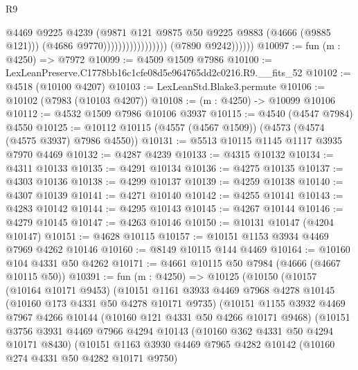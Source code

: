 \begin{lexlean}{R9}
\begin{coremodule}
                                              @4469
                                              @9225
                                              @4239
                                              (@9871
                                                @121
                                                @9875
                                                @50
                                                @9225
                                                @9883
                                                (@4666 (@9885 @121)))
                                              (@4686 @9770)))))))))))))))))
              (@7890 @9242))))))
@10097 := fun (m : @4250) => @7972
@10099 := @4509 @1509 @7986
@10100 := LexLeanPreserve.C1778bb16c1cfe08d5e964765dd2c0216.R9.__fits_52
@10102 := @4518 (@10100 @4207)
@10103 := LexLeanStd.Blake3.permute
@10106 := @10102 (@7983 (@10103 @4207))
@10108 := (m : @4250) -> @10099 @10106
@10112 := @4532 @1509 @7986 @10106 @3937
@10115 := @4540 (@4547 @7984) @4550
@10125 := @10112 @10115 (@4557 (@4567 @1509)) (@4573 (@4574 (@4575 @3937) @7986 @4550))
@10131 := @5513 @10115 @1145 @1117 @3935 @7970 @4469
@10132 := @4287 @4239
@10133 := @4315 @10132
@10134 := @4311 @10133
@10135 := @4291 @10134
@10136 := @4275 @10135
@10137 := @4303 @10136
@10138 := @4299 @10137
@10139 := @4259 @10138
@10140 := @4307 @10139
@10141 := @4271 @10140
@10142 := @4255 @10141
@10143 := @4283 @10142
@10144 := @4295 @10143
@10145 := @4267 @10144
@10146 := @4279 @10145
@10147 := @4263 @10146
@10150 := @10131 @10147 (@4204 @10147)
@10151 := @4628 @10115
@10157 := @10151 @1153 @3934 @4469 @7969 @4262 @10146
@10160 := @8149 @10115 @144 @4469
@10164 := @10160 @104 @4331 @50 @4262
@10171 := @4661 @10115 @50 @7984 (@4666 (@4667 @10115 @50))
@10391 := fun (m : @4250) =>
  @10125
    (@10150
      (@10157
        (@10164 @10171 @9453)
        (@10151
          @1161
          @3933
          @4469
          @7968
          @4278
          @10145
          (@10160 @173 @4331 @50 @4278 @10171 @9735)
          (@10151
            @1155
            @3932
            @4469
            @7967
            @4266
            @10144
            (@10160 @121 @4331 @50 @4266 @10171 @9468)
            (@10151
              @3756
              @3931
              @4469
              @7966
              @4294
              @10143
              (@10160 @362 @4331 @50 @4294 @10171 @8430)
              (@10151
                @1163
                @3930
                @4469
                @7965
                @4282
                @10142
                (@10160 @274 @4331 @50 @4282 @10171 @9750)

\end{coremodule}
\end{lexlean}
